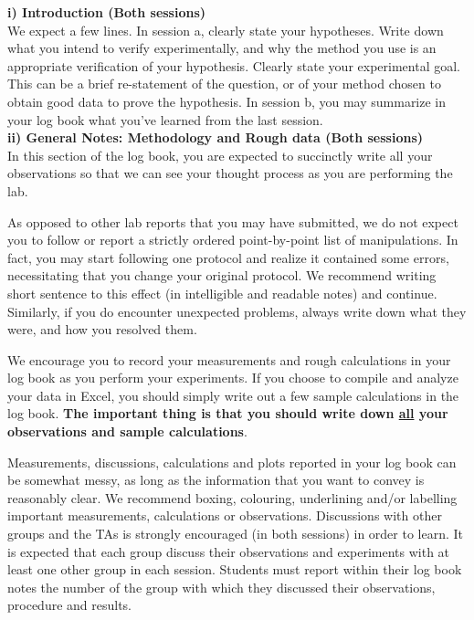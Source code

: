 \documentclass[12pt]{report}
\begin{document}
\noindent \textbf{i) Introduction (Both sessions)} \\
\noindent We expect a few lines. In session a, clearly state your hypotheses. Write down what you intend to verify experimentally, and why the method you use is an appropriate verification of your hypothesis. Clearly state your experimental goal. This can be a brief re-statement of the question, or of your method chosen to obtain good data to prove the hypothesis.
In session b, you may summarize in your log book what you've learned from the last session. \\

\noindent \textbf{ii) General Notes: Methodology and Rough data (Both sessions)} \\
In this section of the log book, you are  expected to succinctly write all your observations so that we can see your thought process as you are performing the lab. 

As opposed to other lab reports that you may have submitted, we do not expect you to follow or report a strictly ordered point-by-point list of manipulations. In fact, you may start following one protocol and realize it contained  some errors, necessitating that you change your original protocol. We recommend writing short sentence to this effect (in intelligible and readable notes) and continue. Similarly, if you do encounter unexpected problems, always write down what they were, and how you resolved them.

We encourage you to record your measurements and rough calculations in your log book as you perform your experiments. If you choose to compile and analyze your data in Excel, you should simply write out a few sample calculations in the log book. 
\textbf{ The important thing is that you should write down \underline{all} your observations and sample calculations}. 

Measurements, discussions, calculations and plots reported in your log book can be somewhat messy, as long as the information that you want to convey is reasonably clear.  We recommend boxing, colouring, underlining and/or labelling important measurements, calculations or observations. 
Discussions with other groups and the TAs is strongly encouraged (in both sessions) in order to learn. 
It is expected that each group discuss their observations and experiments with at least one other group in each session.
Students must report within their log book notes the number of the group with which they discussed their observations, procedure and results.
 \\
\end{document}
